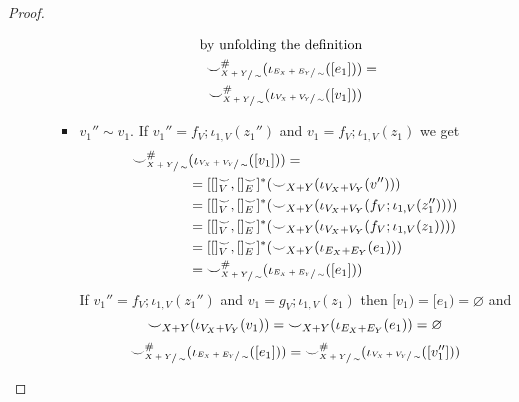 \begin{proof}
\begin{itemize}
\begin{itemize}
\begin{itemize}
\begin{align*}
                        \text{by unfolding the definition}\\
                        {\smile}_{\sfrac{X+Y}{\sim}}^{{\#}}(\iota_{\sfrac{E_{X} + E_{Y}}{\sim}}([e_1])) &=\\
                        {\smile}_{\sfrac{X+Y}{\sim}}^{{\#}}(\iota_{\sfrac{V_{X} + V_{Y}}{\sim}}([v_1]))&
                        \end{align*} 
                      \fi
                \item $v_1'' \sim v_1$. If $v_1'' = f_{V};\iota_{1,V}(z_1'')$ and $v_1 = f_{V};\iota_{1,V}(z_1)$ we get
                    \begin{align*}
                        {\smile}_{\sfrac{X+Y}{\sim}}^{{\#}}&(\iota_{\sfrac{V_{X} + V_{Y}}{\sim}}([v_1])) =\\
                                                                                                                &= [[]_{V}^{{\smile}},[]_{E}^{{\smile}}]^{*}({\smile}_{X+Y}(\iota_{V_{X} + V_{Y}}(v'')))\\
                                                                                                                &= [[]_{V}^{{\smile}},[]_{E}^{{\smile}}]^{*}({\smile}_{X+Y}(\iota_{V_{X} + V_{Y}}(f_{V};\iota_{1,V}(z_1''))))\\
                                                                                                                &= [[]_{V}^{{\smile}},[]_{E}^{{\smile}}]^{*}({\smile}_{X+Y}(\iota_{V_{X} + V_{Y}}(f_{V};\iota_{1,V}(z_1))))\\
                                                                                                                &= [[]_{V}^{{\smile}},[]_{E}^{{\smile}}]^{*}({\smile}_{X+Y}(\iota_{E_{X} + E_{Y}}(e_1)))\\
                                                                                                                &= {\smile}_{\sfrac{X+Y}{\sim}}^{{\#}}(\iota_{\sfrac{E_{X} + E_{Y}}{\sim}}([e_1]))
                    \end{align*}
                    If $v_1'' = f_{V};\iota_{1,V}(z_1'')$ and $v_1 = g_{V};\iota_{1,V}(z_1)$ then $[v_1) = [e_1) = \varnothing$ and 
                    \[
                        {\smile}_{X+Y}(\iota_{V_{X} + V_{Y}}(v_1)) = {\smile}_{X+Y}(\iota_{E_{X} + E_{Y}}(e_1)) = \varnothing
                    \]
                    \begin{align*}
                    \consistency_{\sfrac{X+Y}{\sim}}^{\hashtag}(\iota_{\sfrac{E_{X} + E_{Y}}{\sim}}([e_1])) &= \consistency_{\sfrac{X+Y}{\sim}}^{\hashtag}(\iota_{\sfrac{V_{X} + V_{Y}}{\sim}}([v_1'']))\\

\end{align*}
\end{itemize}
\end{itemize}
\end{itemize}
\end{proof}
